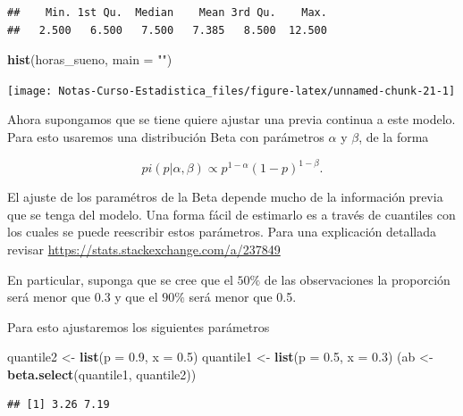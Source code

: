 \documentclass[
  12pt,
]{book}
\newenvironment{Shaded}{\begin{snugshade}}{\end{snugshade}}
\newcommand{\DataTypeTok}[1]{\textcolor[rgb]{0.13,0.29,0.53}{#1}}
\newcommand{\FloatTok}[1]{\textcolor[rgb]{0.00,0.00,0.81}{#1}}
\newcommand{\KeywordTok}[1]{\textcolor[rgb]{0.13,0.29,0.53}{\textbf{#1}}}
\newcommand{\NormalTok}[1]{#1}
\newcommand{\StringTok}[1]{\textcolor[rgb]{0.31,0.60,0.02}{#1}}
\begin{document}
\begin{verbatim}
##    Min. 1st Qu.  Median    Mean 3rd Qu.    Max. 
##   2.500   6.500   7.500   7.385   8.500  12.500
\end{verbatim}

\begin{Shaded}
\begin{Highlighting}[]
\KeywordTok{hist}\NormalTok{(horas\_sueno, }\DataTypeTok{main =} \StringTok{""}\NormalTok{)}
\end{Highlighting}
\end{Shaded}

\begin{center}\texttt{[image: Notas-Curso-Estadistica\_files/figure-latex/unnamed-chunk-21-1]} \end{center}

Ahora supongamos que se tiene quiere ajustar una previa continua a este modelo. Para esto usaremos una distribución Beta con parámetros \(\alpha\) y \(\beta\), de la forma

\[
pi(p\vert \alpha, \beta) \propto p^{1-\alpha} (1-p)^{1-\beta}.
\]

El ajuste de los paramétros de la Beta depende mucho de la información previa que se tenga del modelo. Una forma fácil de estimarlo es a través de cuantiles con los cuales se puede reescribir estos parámetros. Para una explicación detallada revisar \url{https://stats.stackexchange.com/a/237849}

En particular, suponga que se cree que el \(50\%\) de las observaciones la proporción será menor que 0.3 y que el \(90\%\) será menor que 0.5.

Para esto ajustaremos los siguientes parámetros

\begin{Shaded}
\begin{Highlighting}[]
\NormalTok{quantile2 \textless{}{-}}\StringTok{ }\KeywordTok{list}\NormalTok{(}\DataTypeTok{p =} \FloatTok{0.9}\NormalTok{, }\DataTypeTok{x =} \FloatTok{0.5}\NormalTok{)}
\NormalTok{quantile1 \textless{}{-}}\StringTok{ }\KeywordTok{list}\NormalTok{(}\DataTypeTok{p =} \FloatTok{0.5}\NormalTok{, }\DataTypeTok{x =} \FloatTok{0.3}\NormalTok{)}
\NormalTok{(ab \textless{}{-}}\StringTok{ }\KeywordTok{beta.select}\NormalTok{(quantile1, quantile2))}
\end{Highlighting}
\end{Shaded}

\begin{verbatim}
## [1] 3.26 7.19
\end{verbatim}
\end{document}
